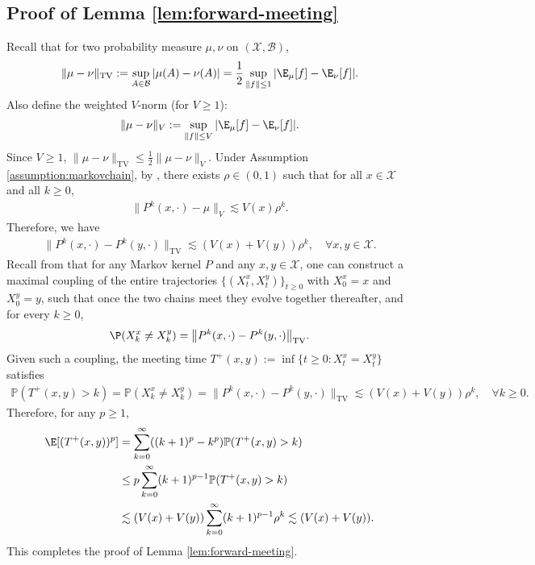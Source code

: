 \documentclass[mnsc,nonblindrev]{informs3}
\begin{document}
\subsection{Proof of Lemma \ref{lem:forward-meeting}}\label{sec:proof-forward-meeting}
Recall that for two probability measure $\mu, \nu$ on $(\mathcal X, \mathcal B)$, 
\begin{align*}
\|\mu-\nu\|_{\operatorname{TV}}:= \sup_{A \in \mathcal B}|\mu(A)-\nu(A)| = \frac{1}{2}\sup_{\|f\|\leq 1}|\E_\mu[f] - \E_\nu[f]|.
\end{align*}
Also define the weighted $V$-norm (for $V \geq 1$):
\begin{align*}
\|\mu-\nu\|_{V}:=\sup_{\|f\|\leq V}|\E_\mu[f] - \E_\nu[f]|.
\end{align*}
Since $V \geq 1$, $\|\mu-\nu\|_{\operatorname{TV}} \leq \frac{1}{2}\|\mu-\nu\|_{V}.$ Under Assumption \ref{assumption:markovchain}, by \cite[Theorem 15.0.1]{Meyn12_book}, there exists $\rho \in (0,1)$ such that for all $x \in \mathcal X$ and all $k \geq 0$,
\begin{align*}
    \|P^k(x, \cdot) - \mu\|_{V} \lesssim V(x)\rho^k.
\end{align*}
Therefore, we have
\begin{align*}
\|P^k(x, \cdot)-P^k(y, \cdot)\|_{\operatorname{TV}} \lesssim (V(x)+V(y))\rho^k, \quad \forall x, y \in \mathcal X.
\end{align*}
Recall from \cite{goldstein1979maximal} that for any Markov kernel $P$ and any
$x,y\in\mathcal X$, one can construct a maximal  coupling of the
entire trajectories $\{(X_t^x,X_t^y)\}_{t\ge 0}$ with $X_0^x=x$ and $X_0^y=y$,
such that once the two chains meet they evolve together thereafter, and for every
$k\ge 0$,
\begin{align*}
  \P(X_k^x\neq X_k^y)
  =
  \bigl\|P^k(x,\cdot)-P^k(y,\cdot)\bigr\|_{\operatorname{TV}}.
\end{align*}
Given such a coupling, the meeting time $T^+(x,y):= \inf\{t \geq 0: X_t^x = X_t^y\}$ satisfies
\begin{align*}
\mathbb P(T^+(x,y)>k) = \mathbb P(X_k^x \neq X_k^y) = \|P^k(x, \cdot)- P^k(y, \cdot)\|_{\operatorname{TV}} \lesssim (V(x) + V(y))\rho^k, \quad \forall k \geq 0.
\end{align*}
Therefore, for any $p \geq 1$, 
\begin{align*}
    \E[(T^+(x,y))^p] &= \sum_{k=0}^{\infty}((k+1)^p - k^p)\mathbb P(T^+(x,y)>k)\\
    &\leq p\sum_{k=0}^{\infty}(k+1)^{p-1}\mathbb P(T^+(x,y)>k)\\
    &\lesssim (V(x) + V(y))\sum_{k=0}^{\infty}(k+1)^{p-1}\rho^k \lesssim (V(x) + V(y)).
\end{align*}
This completes the proof of Lemma \ref{lem:forward-meeting}.
\end{document}
